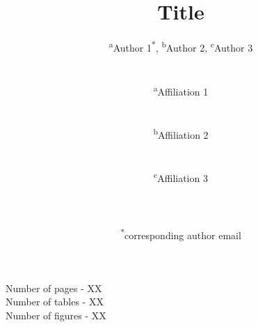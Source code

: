 \documentclass[11pt,a4paper]{article}
\begin{document}
\begin{titlepage}
    \title{Title}
    \author{
        \textsuperscript{a}Author 1\textsuperscript{*}, 
        \textsuperscript{b}Author 2, 
        \textsuperscript{c}Author 3
        \\ \\ \\
        \textsuperscript{a}Affiliation 1\\ 
        \\ \\
        \textsuperscript{b}Affiliation 2\\ 
        \\ \\
        \textsuperscript{c}Affiliation 3\\
        \\ \\ \\
        \textsuperscript{*}corresponding author email
    }
\clearpage %
\maketitle
\vspace*{\fill}
\begin{flushright}{
        \noindent Number of pages - XX \\
        \noindent Number of tables - XX \\
        \noindent Number of figures - XX
}
\end{flushright}
\thispagestyle{empty} %
\end{titlepage}

\onehalfspacing
\linenumbers %
\pagewiselinenumbers %
\modulolinenumbers[3] %
\newpage

\nocite{*} %


\setlength{\bibhang}{0pt}

\end{document}

